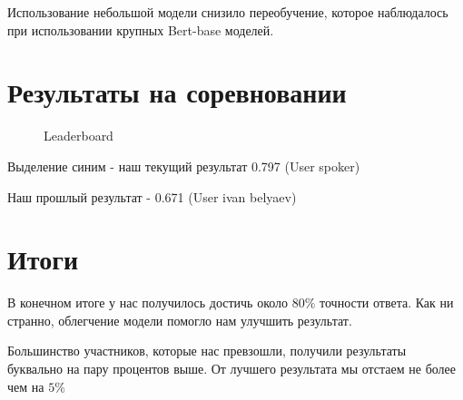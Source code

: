 \documentclass[12pt]{article}
\newcommand{\imgh}[3]
{
\begin{figure}[H]
\center{\texttt{[image: \#2]}}
\caption{#3}
\label{ris:#2}
\end{figure}
}
\begin{document}
Использование небольшой модели снизило переобучение, которое наблюдалось при использовании крупных Bert-base моделей.

\newpage

\section{Результаты на соревновании}

\imgh{17cm}{leaderboard-2.png}{Leaderboard}

Выделение синим - наш текущий результат 0.797 (User spoker)

Наш прошлый результат - 0.671 (User ivan belyaev)

\newpage

\section{Итоги}

В конечном итоге у нас получилось достичь около 80$\%$ точности ответа. Как ни странно, облегчение модели помогло нам улучшить результат. 

Большинство участников, которые нас превзошли, получили результаты буквально на пару процентов выше. От лучшего результата мы отстаем не более чем на $5\%$
\end{document}
